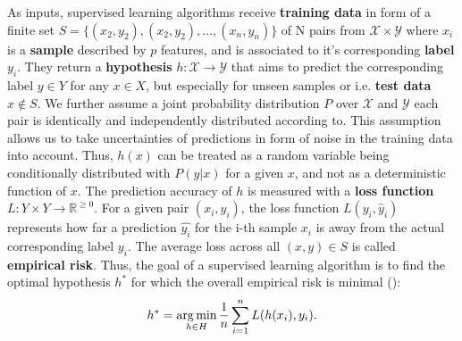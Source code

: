 As inputs, supervised learning algorithms receive \textbf{training data} in form of a finite set $ S = \{({x}_{2}, y_2), ({x}_{2}, y_2), \dots, ({x}_{n}, y_n)\}$ of N pairs from $ \mathcal{X} \times \mathcal{Y} $ where $ x_i $ is a \textbf{sample} described by $ p $ features, and is associated to it's corresponding \textbf{label} $ y_i $.
They return a \textbf{hypothesis} $ h: \mathcal{X} \to \mathcal{Y} $ that aims to predict the corresponding label $ y \in Y $ for any $ x \in X $, but especially for unseen samples or i.e. \textbf{test data} $ x \notin S $.
We further assume a joint probability distribution $ P $ over $ \mathcal{X} $ and $ \mathcal{Y} $ each pair is identically and independently distributed according to. 
This assumption allows us to take uncertainties of predictions in form of noise in the training data into account. 
Thus, $ h(x) $ can be treated as a random variable being conditionally distributed with $ P(y | x) $ for a given $ x $, and not as a deterministic function of $ x $.
The prediction accuracy of $ h $ is measured with a  \textbf{loss function} $ L : Y \times Y \to \mathbb{R}^{\geq 0}$.
For a given pair $ ({x}_i, y_i) $, the loss function $ L(y_i, \hat{y}_i) $ represents how far a prediction $ \hat{y_i} $ for the i-th sample $ x_i $ is away from the actual corresponding label $ y_i $. 
The average loss across all $ (x,y) \in S $ is called \textbf{empirical risk}.
Thus, the goal of a supervised learning algorithm is to find the optimal hypothesis $ h^* $ for which the overall empirical risk is minimal (\cite{SLFoundations}): 
\begin{equation}
	h^* = \operatorname*{arg\,min}_{h \in H} \dfrac{1}{n} \sum_{i=1}^{n} L(h(x_i), y_i).
\end{equation}

